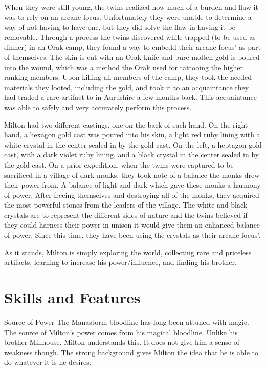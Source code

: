 \documentclass[letterpaper,10pt,twoside,twocolumn,openany]{book}
\begin{document}
When they were still young, the twins realized how much of a burden and flaw it was to rely on an arcane focus. Unfortunately they were unable to determine a way of not having to have one, but they did solve the flaw in having it be removable. Through a process the twins discovered while trapped (to be used as dinner) in an Orak camp, they found a way to embedd their arcane focus' as part of themselves.  The skin is cut with an Orak knife and pure molten gold is poured into the wound, which was a method the Orak used for tattooing the higher ranking members. Upon killing all members of the camp, they took the needed materials they looted, including the gold, and took it to an acquaintance they had traded a rare artifact to in Aurushire a few months back. This acquaintance was able to safely and very accurately perform this process. 

Milton had two different castings, one on the back of each hand. On the right hand, a hexagon gold cast was poured into his skin, a light red ruby lining with a white crystal in the center sealed in by the gold cast. On the left, a heptagon gold cast, with a dark violet ruby lining, and a black crystal in the center sealed in by the gold cast. On a prior expedition, when the twins were captured to be sacrificed in a village of dark monks, they took note of a balance the monks drew their power from. A balance of light and dark which gave these monks a harmony of power. After freeing themselves and destroying all of the monks, they acquired the most powerful stones from the leaders of the village. The white and black crystals are to represent the different sides of nature and the twins believed if they could harness their power in unison it would give them an enhanced balance of power. Since this time, they have been using the crystals as their arcane focus'.

As it stands, Milton is simply exploring the world, collecting rare and priceless artifacts, learning to increase his power/influence, and finding his brother. 

\chapter{Skills and Features}

\begin{paperbox}[float=!t]{Source of Power}
	The Manastorm bloodline has long been attuned with magic. The source of Milton's power comes from his magical bloodline. Unlike his brother Millhouse, Milton understands this. It does not give him a sense of weakness though. The strong background gives Milton the idea that he is able to do whatever it is he desires.
\end{paperbox}
\end{document}
